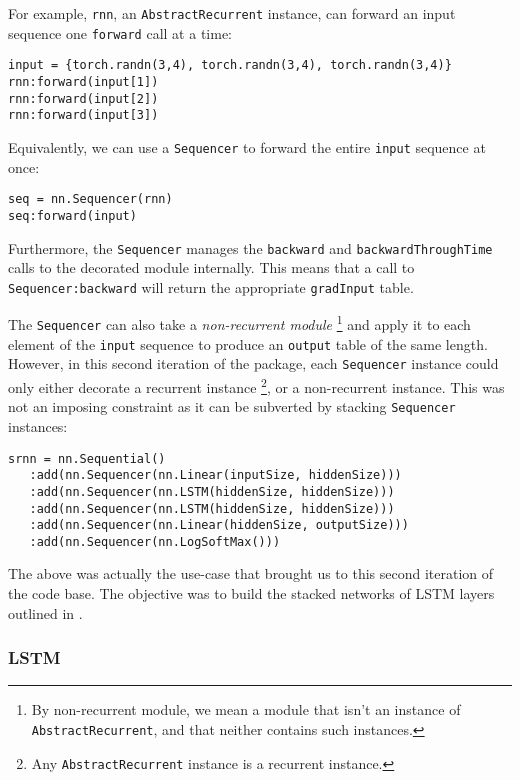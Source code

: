 \documentclass{article} %
\providecommand{\inlinecode}[1]{\texttt{#1}}
\begin{document}
For example, \inlinecode{rnn}, an \inlinecode{AbstractRecurrent} instance, 
can forward an input sequence one \inlinecode{forward} call at a time:

\begin{verbatim}
input = {torch.randn(3,4), torch.randn(3,4), torch.randn(3,4)}
rnn:forward(input[1])
rnn:forward(input[2])
rnn:forward(input[3])
\end{verbatim}

Equivalently, we can use a \inlinecode{Sequencer} to forward the entire \inlinecode{input} sequence at once:

\begin{verbatim}
seq = nn.Sequencer(rnn)
seq:forward(input)
\end{verbatim}

Furthermore, the \inlinecode{Sequencer} manages the \inlinecode{backward} and 
\inlinecode{backwardThroughTime} calls to the decorated module internally. 
This means that a call to \inlinecode{Sequencer:backward} will return the appropriate
\inlinecode{gradInput} table.

The \inlinecode{Sequencer} can also take a \textit{non-recurrent module}
\footnote{By non-recurrent module, we mean a module that isn't an instance of \inlinecode{AbstractRecurrent},
and that neither contains such instances.}
and apply it to each element of the \inlinecode{input} sequence to produce an \inlinecode{output} table of the same length. 
However, in this second iteration of the package, each \inlinecode{Sequencer} 
instance could only either decorate a recurrent instance
\footnote{Any \inlinecode{AbstractRecurrent} instance is a recurrent instance.},
or a non-recurrent instance.
This was not an imposing constraint as it can be subverted by stacking \inlinecode{Sequencer} instances:

\begin{verbatim}
srnn = nn.Sequential()
   :add(nn.Sequencer(nn.Linear(inputSize, hiddenSize)))
   :add(nn.Sequencer(nn.LSTM(hiddenSize, hiddenSize)))
   :add(nn.Sequencer(nn.LSTM(hiddenSize, hiddenSize)))
   :add(nn.Sequencer(nn.Linear(hiddenSize, outputSize)))
   :add(nn.Sequencer(nn.LogSoftMax()))
\end{verbatim}

The above was actually the use-case that brought us to this second iteration of the code base. 
The objective was to build the stacked networks of LSTM layers outlined in \cite{zaremba2014recurrent}.

\subsubsection{LSTM}
\end{document}
